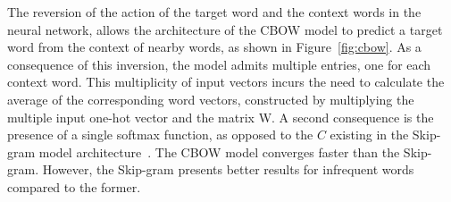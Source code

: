 \documentclass{ieeeaccess}
\begin{document}
The reversion of the action of the target word and the context words in the neural network, allows the architecture of the CBOW model to predict a target word from the context of nearby words, as shown in Figure~\ref{fig:cbow}. As a consequence of this inversion, the model admits multiple entries, one for each context word. This multiplicity of input vectors incurs the need to calculate the average of the corresponding word vectors, constructed by multiplying the multiple input one-hot vector and the matrix W. A second consequence is the presence of a single softmax function, as opposed to the $ C $ existing in the Skip-gram model architecture~\cite{hu2016novel}. The CBOW model converges faster than the Skip-gram. However, the Skip-gram presents better results for infrequent words compared to the former.


\end{document}
